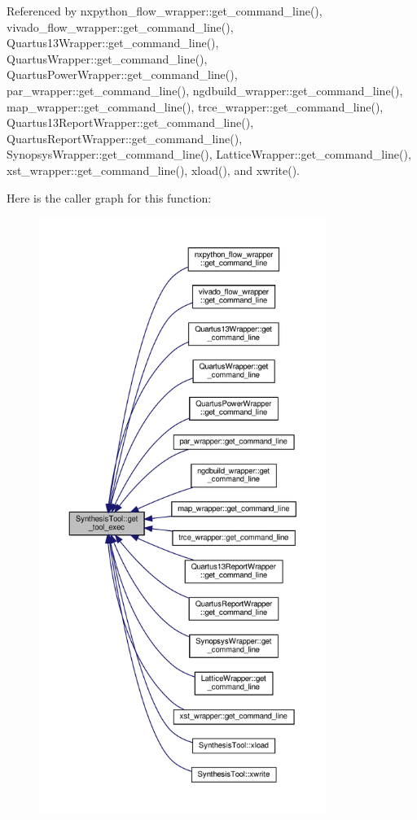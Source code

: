 Referenced by nxpython\+\_\+flow\+\_\+wrapper\+::get\+\_\+command\+\_\+line(), vivado\+\_\+flow\+\_\+wrapper\+::get\+\_\+command\+\_\+line(), Quartus13\+Wrapper\+::get\+\_\+command\+\_\+line(), Quartus\+Wrapper\+::get\+\_\+command\+\_\+line(), Quartus\+Power\+Wrapper\+::get\+\_\+command\+\_\+line(), par\+\_\+wrapper\+::get\+\_\+command\+\_\+line(), ngdbuild\+\_\+wrapper\+::get\+\_\+command\+\_\+line(), map\+\_\+wrapper\+::get\+\_\+command\+\_\+line(), trce\+\_\+wrapper\+::get\+\_\+command\+\_\+line(), Quartus13\+Report\+Wrapper\+::get\+\_\+command\+\_\+line(), Quartus\+Report\+Wrapper\+::get\+\_\+command\+\_\+line(), Synopsys\+Wrapper\+::get\+\_\+command\+\_\+line(), Lattice\+Wrapper\+::get\+\_\+command\+\_\+line(), xst\+\_\+wrapper\+::get\+\_\+command\+\_\+line(), xload(), and xwrite().

Here is the caller graph for this function\+:
\nopagebreak
\begin{figure}[H]
\begin{center}
\leavevmode
\includegraphics[height=550pt]{d9/de0/classSynthesisTool_abe3aeea1f961e93d41dbbcda0b8d6414_icgraph}
\end{center}
\end{figure}
\mbox{\label{classSynthesisTool_a730699a51a36280c89b32f324dedc1a7}} 
